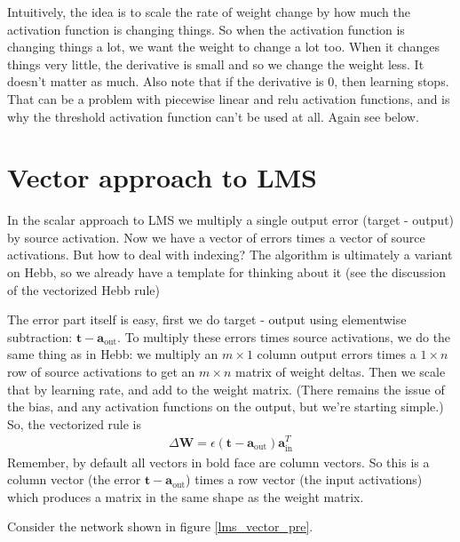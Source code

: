 Intuitively, the idea is to scale the rate of weight change by how much the activation function is changing things. So when the activation function is changing things a lot, we want the weight to change a lot too. When it changes things very little, the derivative is small and so we change the weight less. It doesn't matter as much. Also note that if the derivative is 0, then learning stops. That can be a problem with piecewise linear and relu activation functions, and is why the threshold activation function can't be used at all. Again see below.

\section{Vector approach to LMS}

In the scalar approach to LMS we multiply a single output error (target - output) by source activation. Now we have a vector of errors times a vector of source activations. But how to deal with indexing?  The algorithm is ultimately a variant on Hebb, so we already have a template for thinking about it (see the discussion of the vectorized Hebb rule)

The error part itself is easy, first we do target - output using elementwise subtraction: $\mathbf{t} - \mathbf{a}_{\text{out}}$. To multiply these errors times source activations, we do the same thing as in Hebb: we multiply an $m \times  1$ column output errors times a $1 \times  n$ row of source activations to get an $m \times n$ matrix of weight deltas. Then we scale that by learning rate, and add to the weight matrix. (There remains the issue of the bias, and any activation functions on the output, but we're starting simple.) So, the vectorized rule is
\begin{eqnarray}\label{vectorizedLMS}
\Delta \mathbf{W}  =  \epsilon (\mathbf{t} - \mathbf{a}_{\text{out}}) \mathbf{a}_{\text{in}}^T
\end{eqnarray}
Remember, by default all vectors in bold face are column vectors. So this is a column vector (the error $\mathbf{t} - \mathbf{a}_{\text{out}}$) times a row vector (the input activations) which produces a matrix in the same shape as the weight matrix.

Consider the network shown in figure \ref{lms_vector_pre}.

